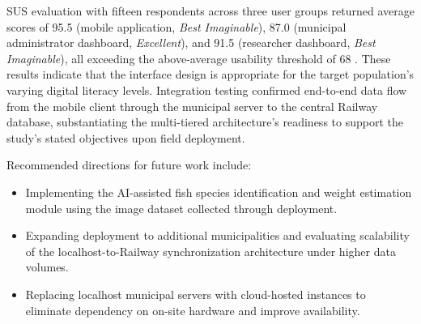 \documentclass{icsthesis}
\begin{document}
\begin{mainmatter}
SUS evaluation with fifteen respondents across three user groups returned average scores
of 95.5 (mobile application, \textit{Best Imaginable}), 87.0 (municipal administrator
dashboard, \textit{Excellent}), and 91.5 (researcher dashboard, \textit{Best
Imaginable}), all exceeding the above-average usability threshold of 68 \cite{Bangor2008}.
These results indicate that the interface design is appropriate for the target
population's varying digital literacy levels. Integration testing confirmed end-to-end
data flow from the mobile client through the municipal server to the central Railway
database, substantiating the multi-tiered architecture's readiness to support the study's
stated objectives upon field deployment.

Recommended directions for future work include:
\begin{itemize}
    \item Implementing the AI-assisted fish species identification and weight estimation
    module using the image dataset collected through deployment.
    \item Expanding deployment to additional municipalities and evaluating scalability of
    the localhost-to-Railway synchronization architecture under higher data volumes.
    \item Replacing localhost municipal servers with cloud-hosted instances to eliminate
    dependency on on-site hardware and improve availability.
\end{itemize}
		
			
	\end{mainmatter}
\end{document}

